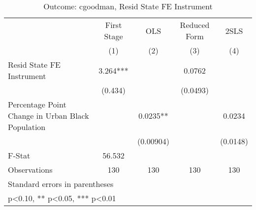 \begin{table}[htbp]\centering
\def\sym#1{\ifmmode^{#1}\else\(^{#1}\)\fi}
\caption{Outcome: cgoodman, Resid State FE Instrument}
\begin{tabular}{l*{4}{c}}
\toprule
                    & First Stage   &         OLS   &Reduced Form   &        2SLS   \\
                    &\multicolumn{1}{c}{(1)}   &\multicolumn{1}{c}{(2)}   &\multicolumn{1}{c}{(3)}   &\multicolumn{1}{c}{(4)}   \\
\midrule
Resid State FE Instrument&       3.264***&               &      0.0762   &               \\
                    &     (0.434)   &               &    (0.0493)   &               \\
\addlinespace
Percentage Point Change in Urban Black Population&               &      0.0235** &               &      0.0234   \\
                    &               &   (0.00904)   &               &    (0.0148)   \\
\midrule
F-Stat              &      56.532   &               &               &               \\
Observations        &         130   &         130   &         130   &         130   \\
\bottomrule
\multicolumn{5}{l}{\footnotesize Standard errors in parentheses}\\
\multicolumn{5}{l}{\footnotesize * p<0.10, ** p<0.05, *** p<0.01}\\
\end{tabular}
\end{table}
